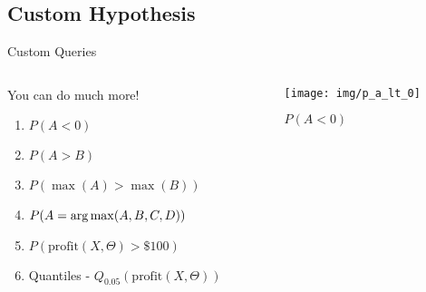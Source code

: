 \documentclass{beamer}
\begin{document}
\subsection{Custom Hypothesis}
\begin{frame}{Custom Queries}
\begin{columns}
    \begin{column}{0.5\linewidth}
    You can do much more!
    \begin{enumerate}
        \item $P(A < 0)$
        \item $P(A > B)$
        \item $P(\max(A) > \max(B))$
        \item $P(A = \operatorname*{arg\,max}(A, B, C, D))$
        \item $P(\text{profit}(X, \Theta) > \$100)$
        \item Quantiles - $Q_{0.05}(\text{profit}(X, \Theta))$
    \end{enumerate}
    \end{column}
     \begin{column}{0.5\linewidth}
    \begin{figure}
        \centering
        \texttt{[image: img/p\_a\_lt\_0]}
        \caption{$P(A<0)$}
    \end{figure}
    \end{column}
\end{columns}
    
\end{frame}
\end{document}
